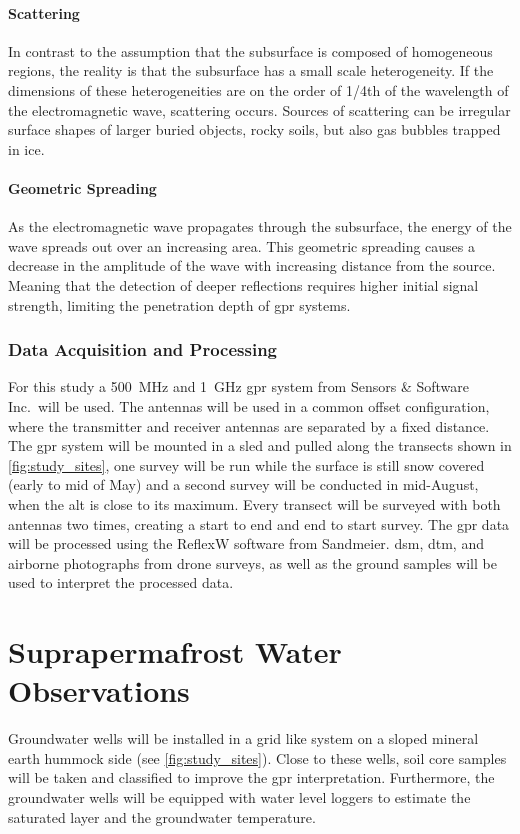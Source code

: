 \paragraph{Scattering}
In contrast to the assumption that the subsurface is composed of homogeneous regions, the reality is that the subsurface has a small scale heterogeneity. 
If the dimensions of these heterogeneities are on the order of 1/4th of the wavelength of the electromagnetic wave, scattering occurs. 
Sources of scattering can be irregular surface shapes of larger buried objects, rocky soils, but also gas bubbles trapped in ice. 

\paragraph{Geometric Spreading}
As the electromagnetic wave propagates through the subsurface, the energy of the wave spreads out over an increasing area. 
This geometric spreading causes a decrease in the amplitude of the wave with increasing distance from the source. 
Meaning that the detection of deeper reflections requires higher initial signal strength, limiting the penetration depth of \gls{gpr} systems.

\subsubsection{Data Acquisition and Processing}
For this study a \SI{500}{\mega\hertz} and \SI{1}{\giga\hertz} \gls{gpr} system from Sensors \& Software Inc.\ will be used. 
The antennas will be used in a common offset configuration, where the transmitter and receiver antennas are separated by a fixed distance. 
The \gls{gpr} system will be mounted in a sled and pulled along the transects shown in \cref{fig:study_sites}, one survey will be run while the surface is still snow covered (early to mid of May) and a second survey will be conducted in mid-August, when the \gls{alt} is close to its maximum. 
Every transect will be surveyed with both antennas two times, creating a start to end and end to start survey.
The \gls{gpr} data will be processed using the ReflexW software from Sandmeier. 
\gls{dsm}, \gls{dtm}, and airborne photographs from drone surveys, as well as the ground samples will be used to interpret the processed data. 

\section{Suprapermafrost Water Observations}
Groundwater wells will be installed in a grid like system on a sloped mineral earth hummock side (see \cref{fig:study_sites}). 
Close to these wells, soil core samples will be taken and classified to improve the \gls{gpr} interpretation. 
Furthermore, the groundwater wells will be equipped with water level loggers to estimate the saturated layer and the groundwater temperature. 

